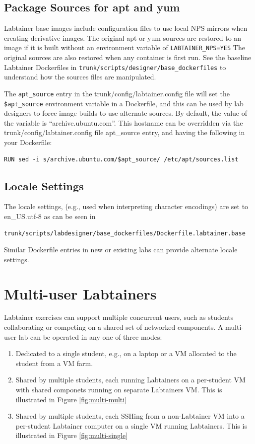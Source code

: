 \documentclass[12pt]{article}
\begin{document}
\subsection{Package Sources for apt and yum}
\label{package sources}
Labtainer base images include configuration files to use local NPS mirrors when creating derivative
images.  The original apt or yum sources are restored to an image if it is built without an environment
variable of {\tt LABTAINER\_NPS=YES}  The original sources are also restored when any container is first
run.  See the baseline Labtainer Dockerfiles in {\tt trunk/scripts/designer/base\_dockerfiles} to understand
how the sources files are manipulated.

The {\tt apt\_source} entry in the trunk/config/labtainer.config file will set the {\tt \$apt\_source}
environment variable in a Dockerfile, and this can be used by lab designers to force image builds to use
alternate sources.  By default, the value of the variable is ``archive.ubuntu.com''.  This hostname can be 
overridden via the trunk/config/labtainer.config file apt\_source entry, and having the following in your Dockerfile:
\begin{verbatim}
RUN sed -i s/archive.ubuntu.com/$apt_source/ /etc/apt/sources.list
\end{verbatim}

\subsection{Locale Settings}
The locale settings, (e.g., used when interpreting character encodings) are set to en\_US.utf-8 
as can be seen in 
\begin{verbatim}
trunk/scripts/labdesigner/base_dockerfiles/Dockerfile.labtainer.base
\end{verbatim}
Similar Dockerfile entries in new or existing labs can provide alternate locale settings.

\section {Multi-user Labtainers}
\label{multi user}
Labtainer exercises can support multiple concurrent users, such as students collaborating or competing on a shared 
set of networked components.  A multi-user lab can be operated in any one of three modes:
\begin{enumerate}
\item Dedicated to a single student, e.g., on a laptop or a VM allocated to the student from a VM farm.
\item Shared by multiple students, each running Labtainers on a per-student VM with shared componets running on separate
Labtainers VM.  This is illustrated in Figure \ref{fig:multi-multi}
\item Shared by multiple students, each SSHing from a non-Labtainer VM into a per-student Labtainer computer on a single
VM running Labtainers.  This is illustrated in Figure \ref{fig:multi-single}
\end{enumerate}
\end{document}
